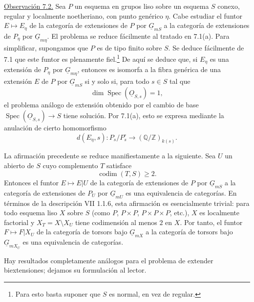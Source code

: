 
\medskip
\noindent\underline{Observación 7.2.} Sea $P$ un esquema en grupos liso
sobre un esquema $S$ conexo, regular y localmente noetheriano, con
punto genérico $\eta$. Cabe estudiar el funtor $E\mapsto E_\eta$ de la
categoría de extensiones de $P$ por $\underline G_{mS}$ a la categoría
de extensiones de $P_\eta$ por $\underline G_{m\eta}$. El problema se
reduce fácilmente al tratado en 7.1(a). Para simplificar, supongamos que
$P$ es de tipo finito sobre $S$. Se deduce fácilmente de 7.1 que este
funtor es plenamente fiel.\footnote{Para esto basta suponer que $S$ es
normal, en vez de regular.} De aquí se deduce que, si $E_\eta$ es una
extensión de $P_\eta$ por $\underline G_{m\eta}$, entonces es isomorfa a
la fibra genérica de una extensión $E$ de $P$ por $\underline G_{mS}$
si y solo si, para todo $s\in S$ tal que
\[
 \dim\operatorname{Spec}(\underline O_{S,s})=1,
\]
el problema análogo de extensión obtenido por el cambio de base
$\operatorname{Spec}(\underline O_{S,s})\to S$ tiene solución. Por
7.1(a), esto se expresa mediante la anulación de cierto homomorfismo
\begin{equation}\tag{7.2.1}
 d(E_\eta,s):P_s/P_s^{\circ}
 \longrightarrow(\mathbb Q/\mathbb Z)_{k(s)}.
\end{equation}


La afirmación precedente se reduce manifiestamente a la siguiente.
Sea $U$ un abierto de $S$ cuyo complemento $T$ satisface
\[
 \operatorname{codim}(T,S)\geq2.
\]
Entonces el funtor $E\mapsto E|U$ de la categoría de extensiones de
$P$ por $\underline G_{mS}$ a la categoría de extensiones de $P_U$ por
$\underline G_{mU}$ es una equivalencia de categorías. En términos de
la descripción VII 1.1.6, esta afirmación es esencialmente trivial:
para todo esquema liso $X$ sobre $S$ (como $P$, $P\times P$,
$P\times P\times P$, etc.), $X$ es localmente factorial y
$X_T=X\setminus X_U$ tiene codimensión al menos $2$ en $X$. Por tanto,
el funtor $F\mapsto F|X_U$ de la categoría de torsors bajo
$\underline G_{mX}$ a la categoría de torsors bajo
$\underline G_{mX_U}$ es una equivalencia de categorías.

Hay resultados completamente análogos para el problema de extender
biextensiones; dejamos su formulación al lector.
